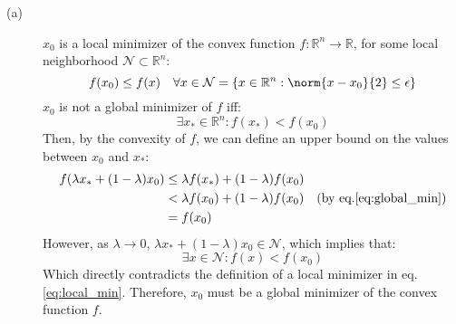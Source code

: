\documentclass[11pt]{article}
\begin{document}
\begin{description}
\begin{description}
    \item[(a)] 
    $x_0$ is a local minimizer of the convex function $f: \mathbb{R}^n \rightarrow \mathbb{R}$,
    for some local neighborhood $\mathcal{N} \subset \mathbb{R}^n$:
    \begin{equation}\label{eq:local_min}
        f(x_0) \leq f(x) \quad \forall x \in \mathcal{N} = \{x \in \mathbb{R}^n: \norm{x-x_0}{2} \leq \epsilon\}
    \end{equation}
    $x_0$ is not a global minimizer of $f$ iff:
    \begin{equation}\label{eq:global_min}
        \exists x_* \in \mathbb{R}^n: f(x_*) < f(x_0)
    \end{equation}
    Then, by the convexity of $f$, we can define an upper bound on the values between $x_0$ and $x_*$:
    \begin{equation*}
        \begin{aligned}
            f(\lambda x_* + (1-\lambda)x_0) &\leq \lambda f(x_*) + (1-\lambda)f(x_0) \\
            &< \lambda f(x_0) + (1-\lambda)f(x_0) \quad \text{(by eq.\ref{eq:global_min})}\\
            &= f(x_0)
        \end{aligned}
    \end{equation*}
    However, as $\lambda \rightarrow 0$, $\lambda x_* + (1-\lambda)x_0 \in \mathcal{N}$, which implies that:
    \begin{equation*}
        \exists{x \in \mathcal{N}}: f(x) < f(x_0)
    \end{equation*}
    Which directly contradicts the definition of a local minimizer in eq.\ref{eq:local_min}.
    Therefore, $x_0$ must be a global minimizer of the convex function $f$.


\end{description}
\end{description}
\end{document}
